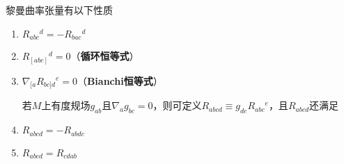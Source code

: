 \begin{theorem}
黎曼曲率张量有以下性质
\begin{enumerate}[（1）]
\item $R_{abc}{}^d = -R_{bac}{}^d$
\item $R_{[abc]}{}^d = 0$（\textbf{循环恒等式}）
\item $\nabla_{[a}R_{bc]d}{}^e = 0$（\textbf{Bianchi恒等式}）

若$M$上有度规场$g_{ab}$且$\nabla_ag_{bc} = 0$，则可定义$R_{abcd} \equiv g_{de}R_{abc}{}^e$，且$R_{abcd}$还满足

\item $R_{abcd} = -R_{abdc}$
\item $R_{abcd} = R_{cdab}$
\end{enumerate}
\end{theorem}

